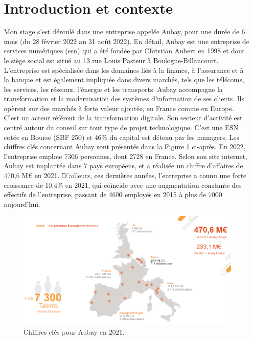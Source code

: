 \documentclass[11pt]{article}
\begin{document}
  \section{Introduction et contexte}      
    Mon stage s'est déroulé dans une entreprise appelée Aubay, pour une durée de 6 mois (du 28 février 2022 au 31 août 2022). 
    En détail, Aubay est une entreprise de services numériques (\acrshort{esn}) qui a été fondée par Christian Aubert en 1998 et 
    dont le siège social est situé au 13 rue Louis Pasteur à Boulogne-Billancourt. L'entreprise est spécialisée dans les domaines 
    liés à la finance, à l'assurance et à la banque et est également impliquée dans divers marchés, tels que les télécoms, 
    les services, les réseaux, l'énergie et les transports. Aubay accompagne la transformation et la modernisation des systèmes 
    d’information de ses clients. Ils opèrent sur des marchés à forte valeur ajoutée, en France comme en Europe. C'est un acteur 
    référent de la transformation digitale. Son secteur d'activité est centré autour du conseil sur tout type de projet technologique.  
    C'est une ESN cotée en Bourse (SBF 250) et 46\% du capital est détenu par les managers. Les chiffres clés concernant Aubay 
    sont présentés dans la Figure \ref{fig:PA1} ci-après. En 2022, l'entreprise emploie 7306 personnes, dont 2728 en France. 
    Selon son site internet, Aubay est implantée dans 7 pays européens, et a réalisée un chiffre d'affaires de 470,6 M€ en 2021. 
    D'ailleurs, ces dernières années, l'entreprise a connu une forte croissance de 10,4\% en 2021, qui coïncide avec une augmentation 
    constante des effectifs de l'entreprise, passant de 4600 employés en 2015 à plus de 7000 aujourd'hui.
  
    \begin{figure}[hbt]  
      \includegraphics[width=\textwidth]{PresentationAubay1.png}    
      \caption{Chiffres clés pour Aubay en 2021.}
      \label{fig:PA1}
    \end{figure}    
    
\end{document}

